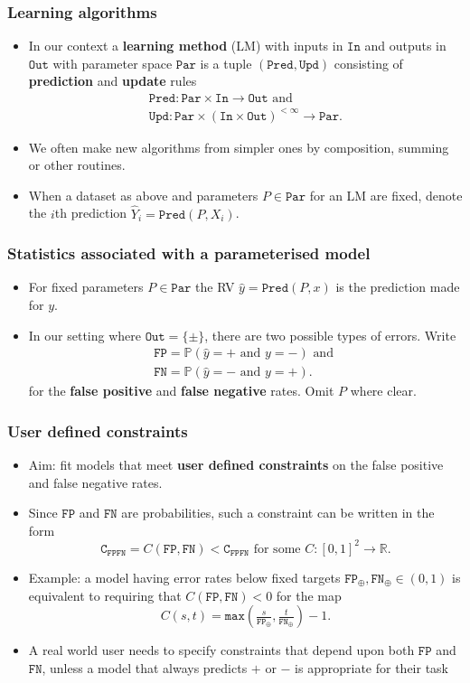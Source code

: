 \documentclass{beamer}
\newcommand{\IN}{{\texttt{In}}}
\newcommand{\OUT}{{\texttt{Out}}}
\newcommand{\TWO}{\{\pm\}}
\newcommand{\PAR}{{\texttt{Par}}}
\newcommand{\UC}{{\texttt{C}_{\texttt{FPFN}}}}
\newcommand{\PRED}{{\texttt{Pred}}}
\newcommand{\yP}{{\hat y}}
\newcommand{\YP}{{\hat Y}}
\newcommand{\UPD}{{\texttt{Upd}}}
\newcommand{\FP}{{\texttt{FP}}}
\newcommand{\FN}{{\texttt{FN}}}
\newcommand{\FPT}{{\texttt{FP}_\oplus}}
\newcommand{\FNT}{{\texttt{FN}_\oplus}}
\newcommand{\CTHRESH}{{\texttt{C}}_{\texttt{FPFN}}}
\begin{document}
\begin{frame}
\frametitle{Learning algorithms}
\begin{itemize}
\item
  In our context a \textbf{learning method} (LM) with inputs in $\IN$ and outputs in $\OUT$ with parameter space $\PAR$ is a tuple $(\PRED,\UPD)$ consisting of \textbf{prediction} and \textbf{update} rules
\begin{gather*}
  \PRED:\PAR\times\IN\rightarrow\OUT\text{ and}\\
  \UPD:\PAR\times\left(\IN\times\OUT\right)^{<\infty}\rightarrow\PAR.
\end{gather*}
\item
We often make new algorithms from simpler ones by composition, summing or other routines.
\item
  When a dataset as above and parameters $P\in\PAR$ for an LM are fixed, denote the $i$th prediction $\YP_i=\PRED(P,X_i)$.
\end{itemize}
\end{frame}
\begin{frame}
\frametitle{Statistics associated with a parameterised model}
  \begin{itemize}
\item
  For fixed parameters $P\in\PAR$ the RV $\yP=\PRED(P,x)$ is the prediction made for $y$.
\item
In our setting where $\OUT=\TWO$, there are two possible types of errors.
Write
\begin{gather*}
  \FP=\mathbb P(\yP=+\text{ and }y=-)\text{ and }\\\FN=\mathbb P(\yP=-\text{ and }y=+).
\end{gather*}
for the \textbf{false positive} and \textbf{false negative} rates.
Omit $P$ where clear.
\end{itemize}
\end{frame}
\begin{frame}
\frametitle{User defined constraints}
\begin{itemize}
\item
  Aim: fit models that meet \textbf{user defined constraints} on the false positive and false negative rates.
\item
  Since $\FP$ and $\FN$ are probabilities, such a constraint can be written in the form
$$
    \UC=C(\FP,\FN)<\CTHRESH\text{ for some }C:[0,1]^2\rightarrow\mathbb R.
$$
\item
  Example: a model having error rates below fixed targets $\FPT,\FNT\in(0,1)$ is equivalent to requiring that $C(\FP,\FN)<0$ for the map
  $$
    C(s,t)=\texttt{max}(\tfrac s{\FPT},\tfrac t{\FNT})-1.
  $$
\item
  A real world user needs to specify constraints that depend upon both $\FP$ and $\FN$, unless a model that always predicts $+$ or $-$ is appropriate for their task
\end{itemize}
\end{frame}
\end{document}
